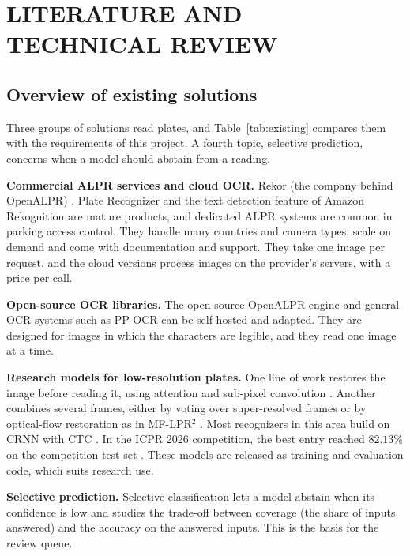 \section{LITERATURE AND TECHNICAL REVIEW}

\subsection{Overview of existing solutions}

Three groups of solutions read plates, and Table~\ref{tab:existing} compares them with the
requirements of this project. A fourth topic, selective prediction, concerns when a model should
abstain from a reading.

\textbf{Commercial ALPR services and cloud OCR.} Rekor (the company behind OpenALPR)
\cite{openalpr}, Plate Recognizer \cite{platerecognizer} and the text detection feature of Amazon
Rekognition are mature products, and dedicated ALPR systems are common in parking access control.
They handle many countries and camera types, scale on demand and come with documentation and
support. They take one image per request, and the cloud versions process images on the provider's
servers, with a price per call.

\textbf{Open-source OCR libraries.} The open-source OpenALPR engine \cite{openalpr} and general OCR
systems such as PP-OCR can be self-hosted and adapted. They are designed for images in which the
characters are legible, and they read one image at a time.

\textbf{Research models for low-resolution plates.} One line of work restores the image before
reading it, using attention and sub-pixel convolution \cite{nascimento2023attention}. Another
combines several frames, either by voting over super-resolved frames \cite{nascimento2025toward} or
by optical-flow restoration as in MF-LPR$^2$ \cite{na2025mflpr2}. Most recognizers in this area build on CRNN with CTC
\cite{shi2017crnn,graves2006ctc}. In the ICPR 2026 competition, the best entry reached $82.13\%$ on
the competition test set \cite{laroca2026icpr}. These models are released as training and evaluation
code, which suits research use.

\textbf{Selective prediction.} Selective classification \cite{geifman2017selective} lets a model
abstain when its confidence is low and studies the trade-off between coverage (the share of inputs
answered) and the accuracy on the answered inputs. This is the basis for the review queue.

